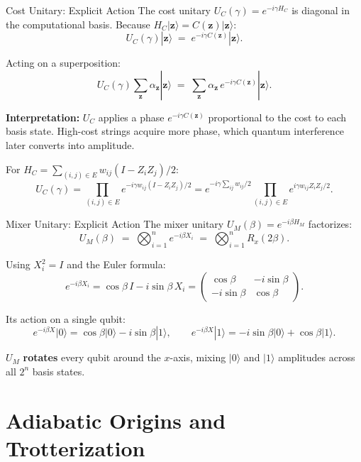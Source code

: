 \documentclass{beamer}
\begin{document}
\begin{frame}
\begin{frame}{Cost Unitary: Explicit Action}
The cost unitary $U_C(\gamma) = e^{-i\gamma H_C}$ is diagonal in the
computational basis. Because $H_C|\mathbf{z}\rangle = C(\mathbf{z})|\mathbf{z}\rangle$:
\[
U_C(\gamma)|\mathbf{z}\rangle
\;=\; e^{-i\gamma C(\mathbf{z})}|\mathbf{z}\rangle.
\]

Acting on a superposition:
\[
U_C(\gamma)\sum_{\mathbf{z}}\alpha_{\mathbf{z}}|\mathbf{z}\rangle
\;=\; \sum_{\mathbf{z}}\alpha_{\mathbf{z}}\,e^{-i\gamma C(\mathbf{z})}|\mathbf{z}\rangle.
\]

\textbf{Interpretation:} $U_C$ applies a phase $e^{-i\gamma C(\mathbf{z})}$
proportional to the cost to each basis state. High-cost strings
acquire more phase, which quantum interference later converts into
amplitude.

\medskip

For $H_C = \sum_{(i,j)\in E}w_{ij}(I-Z_iZ_j)/2$:
\[
U_C(\gamma) = \prod_{(i,j)\in E}
e^{-i\gamma w_{ij}(I-Z_iZ_j)/2}
= e^{-i\gamma \sum_{ij}w_{ij}/2}
\prod_{(i,j)\in E}e^{i\gamma w_{ij}Z_iZ_j/2}.
\]
\end{frame}


\begin{frame}{Mixer Unitary: Explicit Action}
The mixer unitary $U_M(\beta) = e^{-i\beta H_M}$ factorizes:
\[
U_M(\beta)
\;=\; \bigotimes_{i=1}^n e^{-i\beta X_i}
\;=\; \bigotimes_{i=1}^n R_x(2\beta).
\]

Using $X_i^2 = I$ and the Euler formula:
\[
e^{-i\beta X_i}
= \cos\beta\,I - i\sin\beta\,X_i
= \begin{pmatrix}\cos\beta & -i\sin\beta \\ -i\sin\beta & \cos\beta\end{pmatrix}.
\]

Its action on a single qubit:
\[
e^{-i\beta X}|0\rangle = \cos\beta|0\rangle - i\sin\beta|1\rangle,
\qquad
e^{-i\beta X}|1\rangle = -i\sin\beta|0\rangle + \cos\beta|1\rangle.
\]

$U_M$ \textbf{rotates} every qubit around the $x$-axis, mixing
$|0\rangle$ and $|1\rangle$ amplitudes across all $2^n$ basis states.
\end{frame}


\section{Adiabatic Origins and Trotterization}


\end{frame}
\end{document}
